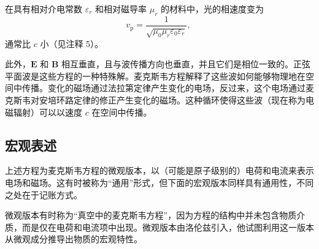 在具有相对介电常数 \(\varepsilon_r\) 和相对磁导率 \(\mu_r\) 的材料中，光的相速度变为
\[
v_{\text{p}} = \frac{1}{\sqrt{\mu_0 \mu_r \varepsilon_0 \varepsilon_r}},~
\]
通常比 \(c\) 小（见注释 5）。

此外，\(\mathbf{E}\) 和 \(\mathbf{B}\) 相互垂直，且与波传播方向也垂直，并且它们是相位一致的。正弦平面波是这些方程的一种特殊解。麦克斯韦方程解释了这些波如何能够物理地在空间中传播。变化的磁场通过法拉第定律产生变化的电场，反过来，这个电场通过麦克斯韦对安培环路定律的修正产生变化的磁场。这种循环使得这些波（现在称为电磁辐射）可以以速度 \(c\) 在空间中传播。
\subsection{宏观表述}
上述方程为麦克斯韦方程的微观版本，以（可能是原子级别的）电荷和电流来表示电场和磁场。这有时被称为“通用”形式，但下面的宏观版本同样具有通用性，不同之处在于记账方式。

微观版本有时称为“真空中的麦克斯韦方程”，因为方程的结构中并未包含物质介质，而是仅在电荷和电流项中出现。微观版本由洛伦兹引入，他试图利用这一版本从微观成分推导出物质的宏观特性。

